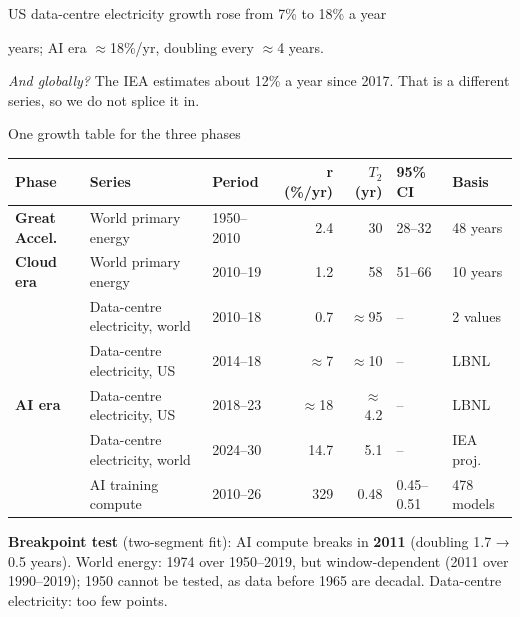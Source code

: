 \begin{frame}{US data-centre electricity growth rose from 7\% to 18\% a year}
{{    years; AI era $\approx$18\%/yr, doubling every $\approx$4 years.}
    \begin{NoteAsk}
      \item \emph{And globally?} The IEA estimates about 12\% a year since 2017. That is a different series, so we do not
        splice it in.
    \end{NoteAsk}
  }
\end{frame}

\begin{frame}{One growth table for the three phases}{}
  {\scriptsize\renewcommand{\arraystretch}{1.04}
  \begin{tabularx}{\textwidth}{@{}l X l r r l l@{}}
    \toprule
    Phase & Series & Period & r (\%/yr) & $T_2$ (yr) & 95\% CI & Basis \\
    \midrule
    \textcolor{phaseGA}{\textbf{Great Accel.}} & World primary energy & 1950–2010 & 2.4 & 30 & 28–32 & 48 years \\
    \textcolor{phaseCloud}{\textbf{Cloud era}} & World primary energy & 2010–19 & 1.2 & 58 & 51–66 & 10 years \\
     & Data-centre electricity, world & 2010–18 & 0.7 & $\approx$95 & – & 2 values \\
     & Data-centre electricity, US & 2014–18 & $\approx$7 & $\approx$10 & – & LBNL \\
    \textcolor{phaseAI}{\textbf{AI era}} & Data-centre electricity, US & 2018–23 & $\approx$18 & $\approx$4.2 & – & LBNL \\
     & Data-centre electricity, world & 2024–30 & 14.7 & 5.1 & – & IEA proj. \\
     & AI training compute & 2010–26 & 329 & 0.48 & 0.45–0.51 & 478 models \\
    \bottomrule
  \end{tabularx}}
  \par\smallskip
  {\scriptsize\textbf{Breakpoint test} (two-segment fit): AI compute breaks in \textbf{2011} (doubling 1.7 → 0.5 years).
  World energy: 1974 over 1950–2019, but window-dependent (2011 over 1990–2019); 1950 cannot be tested, as data before
  1965 are decadal. Data-centre electricity: too few points.\par}

\end{frame}
